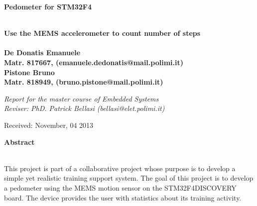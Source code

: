 \documentclass[a4paper,10pt]{article}
\newenvironment*{mytitle}{\begin{LARGE}\bf}{\end{LARGE}\\}%
\newenvironment*{mysubtitle}{\bf}{\\[1.5ex]}%
\newenvironment*{myabstract}{\begin{Large}\bf}{\end{Large}\\[2.5ex]}%
\begin{document}
\begin{mytitle}Pedometer for STM32F4\end{mytitle}
\begin{mysubtitle}Use the MEMS accelerometer to count number of steps\end{mysubtitle}
%
%
\\
De Donatis Emanuele\\
Matr. 817667, (emanuele.dedonatis@mail.polimi.it)\\
\hspace{10ex}
Pistone Bruno\\
Matr. 818949, (bruno.pistone@mail.polimi.it)\\
\begin{flushright}
\emph{Report for the master course of Embedded Systems}\\
\emph{Reviser: PhD. Patrick Bellasi (bellasi@elet.polimi.it)}
\end{flushright}

Received: November, 04 2013\\
\hspace{10ex}

\begin{myabstract} Abstract \end{myabstract}
This project is part of a collaborative project whose purpose is to develop a simple 
yet realistic training support system. The goal of this project is to develop a pedometer 
using the MEMS motion sensor on the STM32F4DISCOVERY board. The device provides
the user with statistics about its training activity.
\end{document}
